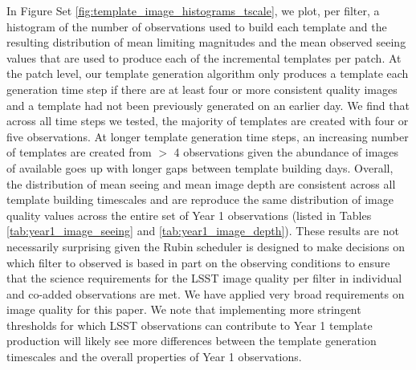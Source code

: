 \documentclass[preprint,linenumbers]{aastex631}
\begin{document}
{		In Figure Set \ref{fig:template_image_histograms_tscale}, we plot, per filter, a histogram of the number of observations used to build each template and the resulting  distribution of mean limiting magnitudes and the mean observed seeing values that are used to produce each of the incremental templates per patch. At the patch level, our template generation algorithm only produces a template each generation time step if there are at least four or more consistent quality images and a template had not been previously generated on an earlier day. We find that across all time steps we tested, the majority of templates are created with four or five observations. At longer template generation time steps, an increasing number of templates are created from  $>$ 4 observations given the abundance of images of available goes up with longer gaps between template building days. Overall,  the distribution of mean seeing and mean image depth are consistent across all template building timescales and are reproduce the same distribution of image quality values across the entire set of Year 1 observations (listed in Tables \ref{tab:year1_image_seeing} and \ref{tab:year1_image_depth}). These results are not necessarily surprising given the Rubin scheduler is designed to make decisions on which filter to observed is based in part on the observing conditions to ensure that the science requirements \citep{lsstSRD} for the LSST image quality per filter in individual and co-added observations are met. We have applied very broad requirements on image quality for this paper. We note that implementing more stringent thresholds for which LSST observations can contribute to  Year 1 template production will likely see more  differences between the template generation timescales and the overall properties of Year 1 observations.
		
		\begin{figure}
			\centering
			\begin{tabular}{c c c}
				
				

\end{tabular}
\end{figure}}
\end{document}

